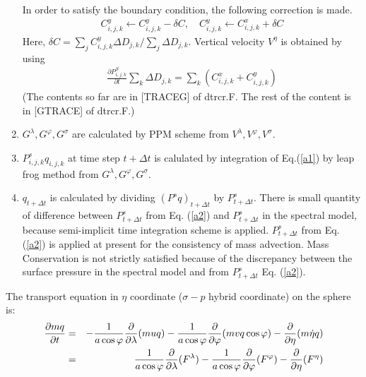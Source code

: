 \begin{enumerate}
  In order to satisfy the boundary condition, the following correction is made. \begin{eqnarray}C^{y}_{i,j,k}\leftarrow C^{y}_{i,j,k}-\delta C, \quad C^{y}_{i,j,k}\leftarrow C^{x}_{i,j,k}+\delta C\end{eqnarray} Here,
  \(\delta C=\sum_{j}C^{y}_{i,j,k}\Delta D_{j,k}/\sum_{j}\Delta D_{j,k}\). Vertical velocity \(V^{\eta}\) is obtained by using \begin{eqnarray}\label{a2}
      \frac{\partial P^{S}_{i,j,k}}{\partial t}\sum_{k}\Delta D_{j,k}=\sum_{k}(C^{x}_{i,j,k}+C^{y}_{i,j,k})\end{eqnarray} (The contents so far are in {[}TRACEG{]} of dtrcr.F. The rest of the content is in
  {[}GTRACE{]} of dtrcr.F.)
\item
  \(G^{\lambda}, G^{\varphi}, G^{\sigma}\) are calculated by PPM scheme from \(V^{\lambda}, V^{\varphi}, V^{\sigma}\).
\item
  \(P^{s}_{i,j,k}q_{i,j,k}\) at time step \(t+\Delta t\) is calulated by integration of Eq.(\ref{a1}) by leap frog method from \(G^{\lambda}, G^{\varphi}, G^{\sigma}\).
\item
  \(q_{t+\Delta t}\) is calculated by dividing \((P^{s}q)_{t+\Delta t}\) by \(P^{s}_{t+\Delta t}\). There is small quantity of difference between \(P^{s}_{t+\Delta t}\) from Eq.
  (\ref{a2}{}) and \(P^{s}_{t+\Delta t}\) in the spectral model, because semi-implicit time integration scheme is applied. \(P^{s}_{t+\Delta t}\) from Eq. (\ref{a2}) is
  applied at present for the consistency of mass advection. Mass Conservation is not strictly satisfied because of the discrepancy between the surface pressure in the spectral model and from
  \(P^{s}_{t+\Delta t}\) Eq. (\ref{a2}).
\end{enumerate}

The transport equation in \(\eta\) coordinate (\(\sigma-p\) hybrid coordinate) on the sphere is: \begin{eqnarray}\begin{aligned}
\frac{\partial mq}{\partial t} &=& - \frac{1}{a \cos \varphi} \frac{\partial}{\partial \lambda}(muq)- \frac{1}{a \cos \varphi} \frac{\partial}{\partial \varphi}(mvq \cos \varphi)- \frac{\partial}{\partial \eta} (m \dot{\eta} q)\notag\\                                                                         &=& \frac{1}{a \cos \varphi} \frac{\partial}{\partial \lambda}(F^{\lambda})- \frac{1}{a \cos \varphi} \frac{\partial}{\partial \varphi}(F^{\varphi})-\frac{\partial}{\partial \eta} (F^{\eta})\end{aligned}\end{eqnarray}

